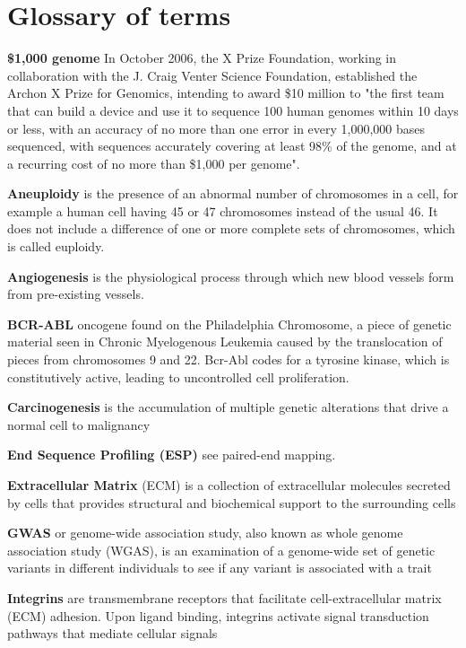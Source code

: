 \chapter{Glossary of terms}
\label{AppendixA}

\textbf{\$1,000 genome} In October 2006, the X Prize Foundation, working in collaboration with the J. Craig Venter Science Foundation, established the Archon X Prize for Genomics, intending to award \$10 million to "the first team that can build a device and use it to sequence 100 human genomes within 10 days or less, with an accuracy of no more than one error in every 1,000,000 bases sequenced, with sequences accurately covering at least 98\% of the genome, and at a recurring cost of no more than \$1,000 per genome".

\textbf{Aneuploidy} is the presence of an abnormal number of chromosomes in a cell, for example a human cell having 45 or 47 chromosomes instead of the usual 46. It does not include a difference of one or more complete sets of chromosomes, which is called euploidy.

\textbf{Angiogenesis} is the physiological process through which new blood vessels form from pre-existing vessels.

\textbf{BCR-ABL} oncogene found on the Philadelphia Chromosome, a piece of genetic material seen in Chronic Myelogenous Leukemia caused by the translocation of pieces from chromosomes 9 and 22. Bcr-Abl codes for a tyrosine kinase, which is constitutively active, leading to uncontrolled cell proliferation.

\textbf{Carcinogenesis} is the accumulation of multiple genetic alterations that drive a normal cell to malignancy

\textbf{End Sequence Profiling (ESP)} see paired-end mapping.

\textbf{Extracellular Matrix} (ECM) is a collection of extracellular molecules secreted by cells that provides structural and biochemical support to the surrounding cells

\textbf{GWAS} or genome-wide association study, also known as whole genome association study (WGAS), is an examination of a genome-wide set of genetic variants in different individuals to see if any variant is associated with a trait

\textbf{Integrins} are transmembrane receptors that facilitate cell-extracellular matrix (ECM) adhesion. Upon ligand binding, integrins activate signal transduction pathways that mediate cellular signals

